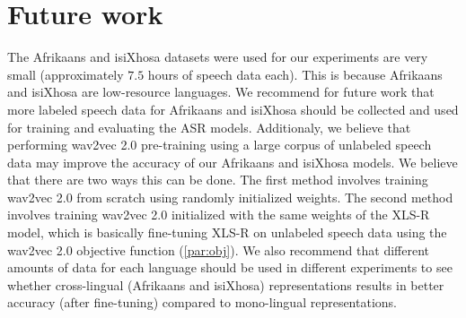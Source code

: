 \section{Future work}
The Afrikaans and isiXhosa datasets were used for our experiments are very small (approximately $7.5$ hours of speech data each).
This is because Afrikaans and isiXhosa are low-resource languages.
We recommend for future work that more labeled speech data for Afrikaans and isiXhosa should be collected and used for training and evaluating the ASR models.
\newpage
Additionaly, we believe that performing wav2vec 2.0 pre-training using a large corpus of unlabeled speech data may improve the accuracy of our Afrikaans and isiXhosa models.
We believe that there are two ways this can be done. 
The first method involves training wav2vec 2.0 from scratch using randomly initialized weights.
The second method involves training wav2vec 2.0 initialized with the same weights of the XLS-R model, 
which is basically fine-tuning XLS-R on unlabeled speech data using the wav2vec 2.0 objective function (\ref{par:obj}).
We also recommend that different amounts of data for each language should be used in different experiments to see whether cross-lingual (Afrikaans and isiXhosa)
representations results in better accuracy (after fine-tuning) compared to mono-lingual representations.